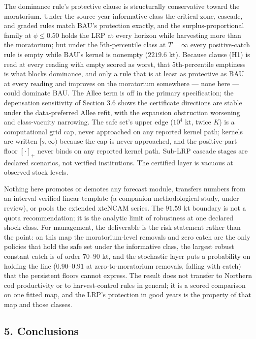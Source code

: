 The dominance rule's protective clause is structurally conservative
toward the moratorium. Under the source-year informative class the
critical-zone, cascade, and graded rules match BAU's protection exactly,
and the surplus-proportional family at \(\phi \le 0.50\) holds the LRP
at every horizon while harvesting more than the moratorium; but under
the 5th-percentile class at \(T=\infty\) every positive-catch rule is
empty while BAU's kernel is nonempty (\(2219.6\) kt). Because clause
(H1) is read at every reading with empty scored as worst, that
5th-percentile emptiness is what blocks dominance, and only a rule that
is at least as protective as BAU at every reading and improves on the
moratorium somewhere --- none here --- could dominate BAU. The Allee
term is off in the primary specification; the depensation sensitivity of
Section 3.6 shows the certificate directions are stable under the
data-preferred Allee refit, with the expansion obstruction worsening and
class-vacuity narrowing. The safe set's upper edge (\(10^4\) kt, twice
\(K\)) is a computational grid cap, never approached on any reported
kernel path; kernels are written \([s, \infty)\) because the cap is
never approached, and the positive-part floor \([\cdot]_+\) never binds
on any reported kernel path. Sub-LRP cascade stages are declared
scenarios, not verified institutions. The certified layer is vacuous at
observed stock levels.

Nothing here promotes or demotes any forecast module, transfers numbers
from an interval-verified linear template (a companion methodological
study, under review), or pools the extended xteNCAM series. The \(91.59\)
kt boundary is not a quota recommendation; it is the analytic limit of
robustness at one declared shock class. For management, the deliverable
is the risk statement rather than the point: on this map the
moratorium-level removals and zero catch are the only policies that hold
the safe set under the informative class, the largest robust constant
catch is of order \(70\)--\(90\) kt, and the stochastic layer puts a
probability on holding the line (\(0.90\)--\(0.91\) at
zero-to-moratorium removals, falling with catch) that the persistent
floors cannot express. The result does not transfer to Northern cod
productivity or to harvest-control rules in general; it is a scored
comparison on one fitted map, and the LRP's protection in good years is
the property of that map and those classes.

\subsection{5. Conclusions}\label{budget-conclusions}

